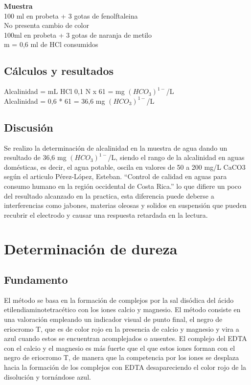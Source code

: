 \documentclass[a4paper,12pt]{article} %
\begin{document}
\textbf{Muestra} \\
100 ml en probeta + 3 gotas de fenolftaleina \\
No presenta cambio de color \\
100ml en probeta + 3 gotas de naranja de metilo \\ 
m = 0,6 ml de HCl consumidos \\

\subsection{Cálculos y resultados} 
Alcalinidad = mL HCl 0,1 N x 61 = mg $(HCO_3)^{1-}$/L   \\
Alcalinidad = 0,6 * 61 = 36,6 mg $(HCO_3)^{1-}$/L  

\subsection{Discusión} 
Se realizo la determinación de alcalinidad en la muestra de agua dando un resultado de 36,6 mg $(HCO_3)^{1-}$/L, siendo el rango de la alcalinidad en aguas domésticas, es decir, el agua potable, oscila en valores de 50 a 200 mg/L CaCO3 según el articulo Pérez-López, Esteban. “Control de calidad en aguas para consumo humano en la región occidental de Costa Rica.” lo que difiere un poco del resultado alcanzado en la practica, esta diferencia puede deberse a interferencias como jabones, materias oleosas y solidos en suspensión que pueden recubrir el electrodo y causar una respuesta retardada en la lectura.

\section{Determinación de dureza}

\subsection{Fundamento} 
El método se basa en la formación de complejos por la sal disódica del ácido etilendiaminotetracético con los iones calcio y magnesio. El método consiste en una  valoración  empleando  un indicador visual de punto final, el negro de eriocromo T, que 
es de color rojo en la presencia de calcio y magnesio y vira a azul cuando estos se encuentran acomplejados o ausentes. El complejo del EDTA con el calcio y el magnesio es más fuerte que el que estos iones forman con el negro de eriocromo T, 
de manera que la competencia por los iones se desplaza hacia la formación de los complejos con EDTA desapareciendo el color rojo de la disolución y tornándose azul.         
\end{document}

